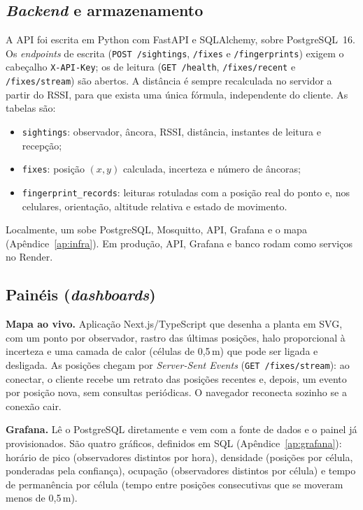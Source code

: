 \documentclass[12pt]{article}
\newcommand{\arq}[1]{\texttt{\detokenize{#1}}}
\begin{document}
\subsection{\textit{Backend} e armazenamento}
A API foi escrita em Python com FastAPI \cite{fastapi} e SQLAlchemy, sobre PostgreSQL~16. Os
\textit{endpoints} de escrita (\texttt{POST /sightings}, \texttt{/fixes} e \texttt{/fingerprints})
exigem o cabeçalho \texttt{X-API-Key}; os de leitura (\texttt{GET /health}, \texttt{/fixes/recent}
e \texttt{/fixes/stream}) são abertos. A distância é sempre recalculada no servidor a partir do
RSSI, para que exista uma única fórmula, independente do cliente. As tabelas são:
\begin{itemize}
  \item \texttt{sightings}: observador, âncora, RSSI, distância, instantes de leitura e recepção;
  \item \texttt{fixes}: posição $(x, y)$ calculada, incerteza e número de âncoras;
  \item \texttt{fingerprint\_records}: leituras rotuladas com a posição real do ponto e, nos
    celulares, orientação, altitude relativa e estado de movimento.
\end{itemize}
Localmente, um \arq{docker-compose.yml} sobe PostgreSQL, Mosquitto, API, Grafana e o mapa
(Apêndice~\ref{ap:infra}). Em produção, API, Grafana e banco rodam como serviços no Render.

\subsection{Painéis (\textit{dashboards})}
\textbf{Mapa ao vivo.} Aplicação Next.js/TypeScript que desenha a planta em SVG, com um ponto
por observador, rastro das últimas posições, halo proporcional à incerteza e uma camada de calor
(células de 0,5\,m) que pode ser ligada e desligada. As posições chegam por
\textit{Server-Sent Events} (\texttt{GET /fixes/stream}): ao conectar, o cliente recebe um retrato
das posições recentes e, depois, um evento por posição nova, sem consultas periódicas. O navegador
reconecta sozinho se a conexão cair.

\textbf{Grafana.} Lê o PostgreSQL diretamente e vem com a fonte de dados e o painel já
provisionados. São quatro gráficos, definidos em SQL (Apêndice~\ref{ap:grafana}): horário de pico
(observadores distintos por hora), densidade (posições por célula, ponderadas pela confiança),
ocupação (observadores distintos por célula) e tempo de permanência por célula (tempo entre
posições consecutivas que se moveram menos de 0,5\,m).
\end{document}
